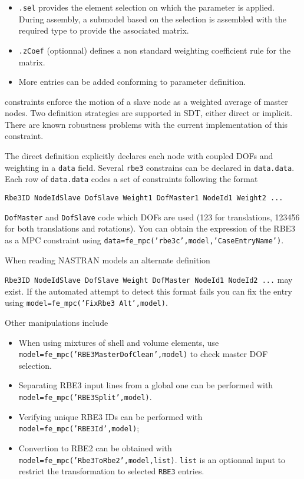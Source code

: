 \begin{SDT}
\begin{itemize}
\begin{itemize}
\item {\tt .sel} provides the element selection on which the parameter is applied. During assembly, a submodel based on the selection is assembled with the required type to provide the associated matrix.
\item {\tt .zCoef} (optionnal) defines a non standard weighting coefficient rule for the matrix.
\item More entries can be added conforming to \ferange parameter definition.
\end{itemize}
\end{itemize}

\end{SDT}


 constraints enforce the motion of a slave node as a weighted average of master nodes. Two definition strategies are supported in SDT, either direct or implicit. There are known robustness problems with the current implementation of this constraint.

The direct definition explicitly declares each node with coupled DOFs and weighting in a {\tt data} field. Several {\tt rbe3} constrains can be declared in {\tt data.data}. Each row of {\tt data.data} codes a set of constraints following the format

{\tt Rbe3ID NodeIdSlave DofSlave Weight1 DofMaster1 NodeId1 Weight2 ...}

{\tt DofMaster} and {\tt DofSlave} code which DOFs are used (123 for translations, 123456 for both translations and rotations). You can obtain the expression of the RBE3 as a MPC constraint using {\tt data=fe\_mpc('rbe3c',model,'CaseEntryName')}. 

When reading NASTRAN models an alternate definition 

{\tt Rbe3ID NodeIdSlave DofSlave Weight DofMaster NodeId1 NodeId2 ...}
%
may exist. If the automated attempt to detect this format fails you can fix the entry using {\tt model=fe\_mpc('FixRbe3 Alt',model)}. 

Other manipulations include
\begin{itemize}
\item When using mixtures of shell and volume elements, use {\tt model=fe\_mpc('RBE3MasterDofClean',model)} to check master DOF selection.
\item Separating RBE3 input lines from a global one can be performed with {\tt model=fe\_mpc('RBE3Split',model)}.
\item Verifying unique RBE3 IDs can be performed with {\tt model=fe\_mpc('RBE3Id',model)};
\item Convertion to RBE2 can be obtained with {\tt model=fe\_mpc('Rbe3ToRbe2',model,list)}. {\tt list} is an optionnal input to restrict the transformation to selected {\tt RBE3} entries.
\end{itemize}


